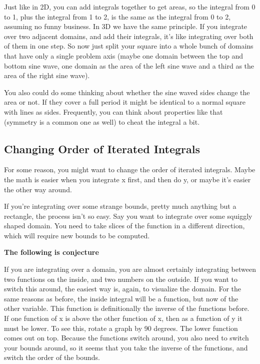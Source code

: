 \documentclass[12pt, letterpaper]{article}
\begin{document}
Just like in 2D, you can add integrals together to get areas,
so the integral from 0 to 1, plus the integral from 1 to 2, is the same as the integral from 0 to 2, assuming no funny business.
In 3D we have the same principle. If you integrate over two adjacent domains, and add their integrals, it's like integrating over both of them in one step.
So now just split your square into a whole bunch of domains that have only a single problem axis (maybe one domain between the top and bottom sine wave, one domain as the area of the left sine wave and a third as the area of the right sine wave).

You also could do some thinking about whether the sine waved sides change the area or not.
If they cover a full period it might be identical to a normal square with lines as sides.
Frequently, you can think about properties like that (symmetry is a common one as well) to cheat the integral a bit.

\subsection{Changing Order of Iterated Integrals}
For some reason, you might want to change the order of iterated integrals. 
Maybe the math is easier when you integrate x first, and then do y, or maybe it's easier the other way around.

If you're integrating over some strange bounds, pretty much anything but a rectangle, the process isn't so easy.
Say you want to integrate over some squiggly shaped domain.
You need to take slices of the function in a different direction, which will require new bounds to be computed.

\textbf{The following is conjecture}

If you are integrating over a domain, you are almost certainly integrating between two functions on the inside, and two numbers on the outside.
If you want to switch this around, the easiest way is, again, to visualize the domain.
For the same reasons as before, the inside integral will be a function, but now of the other variable.
This function is definitionally the inverse of the functions before.
If one function of x is above the other function of x, then as a function of y it must be lower.
To see this, rotate a graph by 90 degrees. The lower function comes out on top.
Because the functions switch around, you also need to switch your bounds around, so it seems that you take the inverse of the functions, and switch the order of the bounds.
\end{document}

